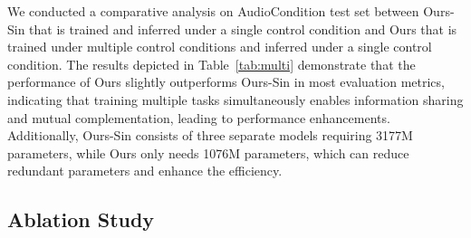 \documentclass[letterpaper]{article} %
\begin{document}
\begin{table}[!h]\footnotesize
    \centering
    \caption{The control performance between multiple and single control condition.}
    \label{tab:multi}
\end{table}

We conducted a comparative analysis on AudioCondition test set between Ours-Sin that is trained and inferred under a single control condition and Ours that is trained under multiple control conditions and inferred under a single control condition. The results depicted in Table~\ref{tab:multi} demonstrate that the performance of Ours slightly outperforms 
Ours-Sin in most evaluation metrics, indicating that training multiple tasks simultaneously enables information sharing and mutual complementation, leading to performance enhancements. Additionally, Ours-Sin consists of three separate models requiring 3177M parameters, while Ours only needs 1076M parameters, which can reduce redundant parameters and enhance the efficiency.

\subsection{Ablation Study}
\end{document}
